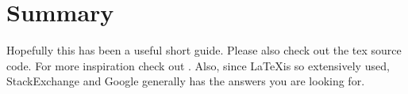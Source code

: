 \section{Summary}
Hopefully this has been a useful short guide. Please also check out the tex source code. For more inspiration check out \cite{wikibookLatex}. Also, since \LaTeX is so extensively used, StackExchange and Google generally has the answers you are looking for.
